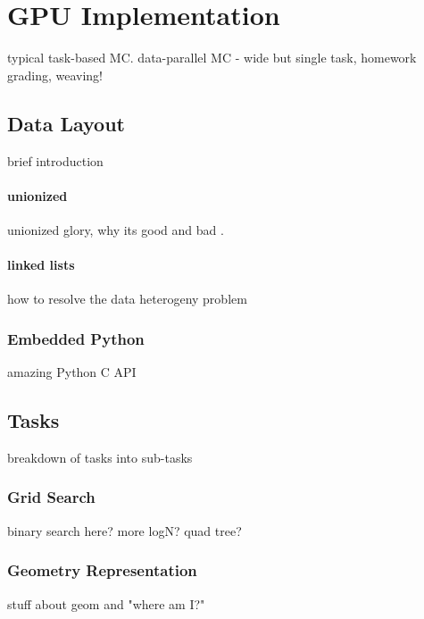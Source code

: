\chapter{GPU Implementation}

typical task-based MC.  data-parallel MC - wide but single task, homework grading, weaving!


\section{Data Layout}

brief introduction

\subsubsection{unionized}

unionized glory, why its good and bad \cite{jaakko}.


\subsubsection{linked lists}

how to resolve the data heterogeny problem


\subsection{Embedded Python}

amazing Python C API



\section{Tasks}

breakdown of tasks into sub-tasks

\subsection{Grid Search}

binary search here? more logN?  quad tree?

\subsection{Geometry Representation}

stuff about geom and "where am I?"

